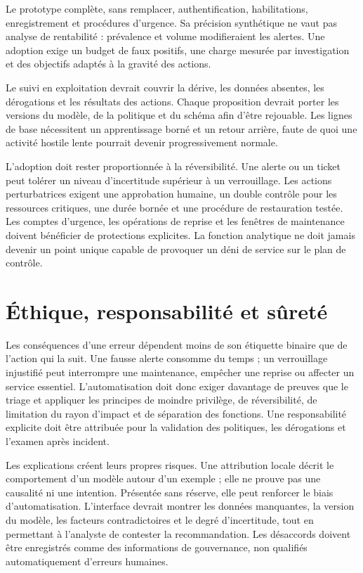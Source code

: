 \documentclass[11pt,a4paper,oneside]{report}
\theoremstyle{definition}
\theoremstyle{plain}
\begin{document}
Le prototype complète, sans remplacer, authentification, habilitations,
enregistrement et procédures d'urgence. Sa précision synthétique ne vaut pas
analyse de rentabilité : prévalence et volume modifieraient les alertes. Une
adoption exige un budget de faux positifs, une charge mesurée par investigation
et des objectifs adaptés à la gravité des actions.

Le suivi en exploitation devrait couvrir la dérive, les données absentes, les
dérogations et les résultats des actions. Chaque proposition devrait porter
les versions du modèle, de la politique et du schéma afin d'être rejouable. Les
lignes de base nécessitent un apprentissage borné et un retour arrière, faute
de quoi une activité hostile lente pourrait devenir progressivement normale.

L'adoption doit rester proportionnée à la réversibilité. Une alerte ou un
ticket peut tolérer un niveau d'incertitude supérieur à un verrouillage. Les
actions perturbatrices exigent une approbation humaine, un double contrôle pour
les ressources critiques, une durée bornée et une procédure de restauration
testée. Les comptes d'urgence, les opérations de reprise et les fenêtres de
maintenance doivent bénéficier de protections explicites. La fonction
analytique ne doit jamais devenir un point unique capable de provoquer un déni
de service sur le plan de contrôle.

\section{Éthique, responsabilité et sûreté}
\label{sec:validation-ethics}

Les conséquences d'une erreur dépendent moins de son étiquette binaire que de
l'action qui la suit. Une fausse alerte consomme du temps ; un verrouillage
injustifié peut interrompre une maintenance, empêcher une reprise ou affecter
un service essentiel. L'automatisation doit donc exiger davantage de preuves
que le triage et appliquer les principes de moindre privilège, de
réversibilité, de limitation du rayon d'impact et de séparation des fonctions.
Une responsabilité explicite doit être attribuée pour la validation des
politiques, les dérogations et l'examen après incident.

Les explications créent leurs propres risques. Une attribution locale décrit
le comportement d'un modèle autour d'un exemple ; elle ne prouve pas une
causalité ni une intention. Présentée sans réserve, elle peut renforcer le
biais d'automatisation. L'interface devrait montrer les données manquantes, la
version du modèle, les facteurs contradictoires et le degré d'incertitude, tout
en permettant à l'analyste de contester la recommandation. Les désaccords
doivent être enregistrés comme des informations de gouvernance, non qualifiés
automatiquement d'erreurs humaines.
\end{document}
